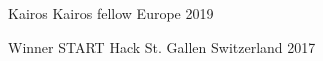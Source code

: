 



\begin{cvhonors}

  \cvhonor
    {Kairos} %
    {Kairos fellow} %
    {Europe} %
    {2019} %

  \cvhonor
    {Winner} %
    {START Hack} %
    {St. Gallen Switzerland} %
    {2017} %


\end{cvhonors}

